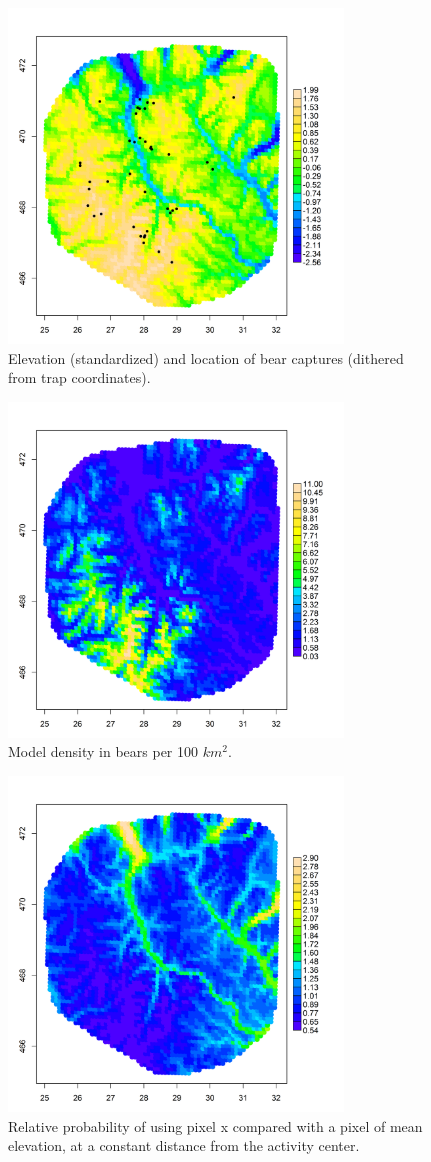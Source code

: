 \documentclass[12pt]{article}
\begin{document}
\begin{figure}
\centering
\includegraphics[width=3.5in,height=3.5in]{figs/elev_captures.png}
\caption{Elevation (standardized) and location of bear captures
  (dithered from trap coordinates).
}
\label{fig.elevation}
\end{figure}


\begin{figure}
\centering
\includegraphics[width=3.5in,height=3.5in]{figs/density.png}
\caption{Model density in bears per 100 $km^2$.
}
\label{fig.density}
\end{figure}


\begin{figure}
\centering
\includegraphics[width=3.5in,height=3.5in]{figs/spaceusage.png}
\caption{Relative probability of using pixel x compared with a pixel
  of mean elevation, at a constant distance from the activity center.
}
\label{fig.spaceusage}
\end{figure}





\clearpage
\newpage
\end{document}
